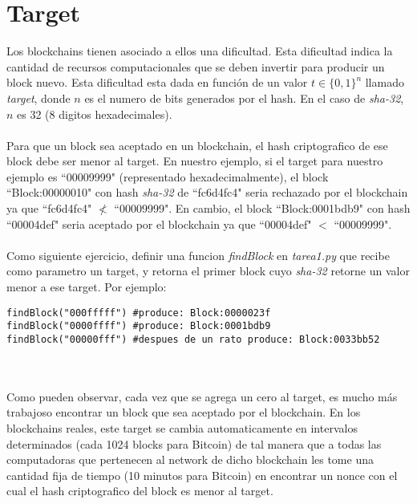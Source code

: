 \documentclass{article}
\begin{document}
\section{Target}
Los blockchains tienen asociado a ellos una dificultad. Esta dificultad
indica la cantidad de recursos computacionales que se deben invertir para
producir un block nuevo. Esta dificultad esta dada en funci\'{o}n de un
valor $t \in \{0,1\}^n$ llamado \emph{target}, donde $n$ es el numero de bits
generados por el hash. En el caso de \emph{sha-32}, $n$ es 32 (8 digitos hexadecimales).
\\\\
Para que un block sea aceptado en un blockchain, el hash
criptografico de ese block debe ser menor al target. En nuestro ejemplo,
si el target para nuestro ejemplo es ``00009999" (representado hexadecimalmente),
el block ``Block:00000010" con hash \emph{sha-32} de ``fc6d4fc4" seria rechazado por el
blockchain ya que ``fc6d4fc4" $\not<$ ``00009999". En cambio, el block ``Block:0001bdb9"
con hash ``00004def" seria aceptado por el blockchain ya que ``00004def" $<$ ``00009999".
\\\\
Como siguiente ejercicio, definir una funcion \emph{findBlock} en \emph{tarea1.py}
que recibe como parametro un target, y retorna el primer block cuyo \emph{sha-32}
retorne un valor menor a ese target. Por ejemplo:
\begin{lstlisting}
findBlock("000fffff") #produce: Block:0000023f
findBlock("0000ffff") #produce: Block:0001bdb9
findBlock("00000fff") #despues de un rato produce: Block:0033bb52
\end{lstlisting}
\\\\
Como pueden observar, cada vez que se agrega un cero al target, es mucho m\'{a}s
trabajoso encontrar un block que sea aceptado por el blockchain. En los blockchains
reales, este target se cambia automaticamente en intervalos determinados (cada 1024 blocks para Bitcoin)
de tal manera que a todas las computadoras que pertenecen al network de dicho blockchain
les tome una cantidad fija de tiempo (10 minutos para Bitcoin) en encontrar un nonce
con el cual el hash criptografico del block es menor al target.
\end{document}
